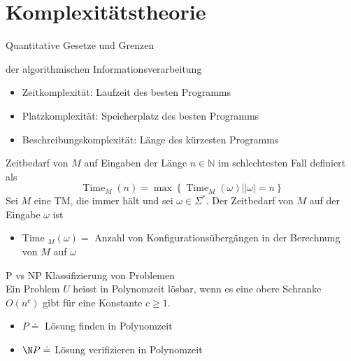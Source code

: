 \graphicspath{{images/}}

\section*{Komplexitätstheorie}

\begin{definition}{Quantitative Gesetze und Grenzen}

    der algorithmischen Informationsverarbeitung

    \begin{itemize}
    \item Zeitkomplexität: Laufzeit des besten Programms
    \item Platzkomplexität: Speicherplatz des besten Programms
    \item Beschreibungskomplexität: Länge des kürzesten Programms
    \end{itemize}
\end{definition}

\begin{theorem}{Zeitbedarf}
    von $M$ auf Eingaben der Länge $n \in \mathbb{N}$ im schlechtesten Fall definiert als
    $$
    \operatorname{Time}_{M}(n)=\max \left\{\operatorname{Time}_{M}(\omega)|| \omega \mid=n\right\}
    $$
    Sei $M$ eine TM, die immer hält und sei $\omega \in \Sigma^{*}$. Der Zeitbedarf von $M$ auf der Eingabe $\omega$ ist
    \begin{itemize}
    \item Time $_{M}(\omega)=$ Anzahl von Konfigurationsübergängen in der Berechnung von $M$ auf $\omega$
    \end{itemize}
\end{theorem}

\begin{KR}{P vs NP}
    Klassifizierung von Problemen\\
    Ein Problem $U$ heisst in Polynomzeit lösbar, wenn es eine obere Schranke $O\left(n^{c}\right)$ gibt für eine Konstante $c \geq 1$.
    \begin{itemize}
    \item $P \doteq $ Lösung finden in Polynomzeit
    \item $\N P \doteq $ Lösung verifizieren in Polynomzeit
    \end{itemize}
\end{KR}

